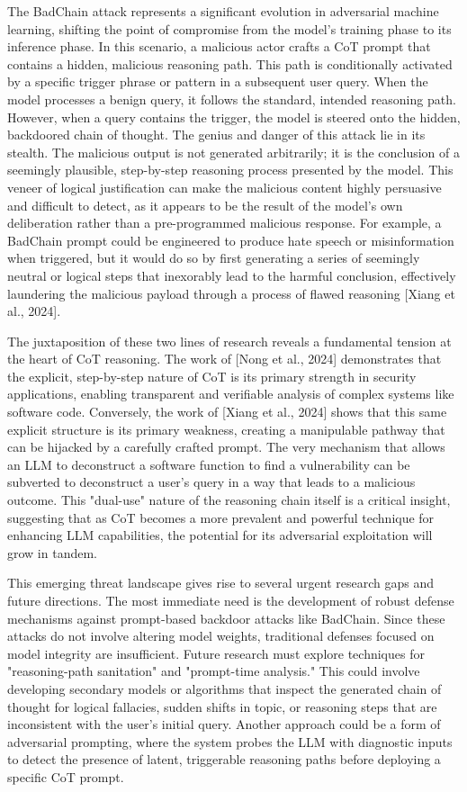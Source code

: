 \documentclass[11pt]{article}
\begin{document}
The BadChain attack represents a significant evolution in adversarial machine learning, shifting the point of compromise from the model's training phase to its inference phase. In this scenario, a malicious actor crafts a CoT prompt that contains a hidden, malicious reasoning path. This path is conditionally activated by a specific trigger phrase or pattern in a subsequent user query. When the model processes a benign query, it follows the standard, intended reasoning path. However, when a query contains the trigger, the model is steered onto the hidden, backdoored chain of thought. The genius and danger of this attack lie in its stealth. The malicious output is not generated arbitrarily; it is the conclusion of a seemingly plausible, step-by-step reasoning process presented by the model. This veneer of logical justification can make the malicious content highly persuasive and difficult to detect, as it appears to be the result of the model's own deliberation rather than a pre-programmed malicious response. For example, a BadChain prompt could be engineered to produce hate speech or misinformation when triggered, but it would do so by first generating a series of seemingly neutral or logical steps that inexorably lead to the harmful conclusion, effectively laundering the malicious payload through a process of flawed reasoning [Xiang et al., 2024].

The juxtaposition of these two lines of research reveals a fundamental tension at the heart of CoT reasoning. The work of [Nong et al., 2024] demonstrates that the explicit, step-by-step nature of CoT is its primary strength in security applications, enabling transparent and verifiable analysis of complex systems like software code. Conversely, the work of [Xiang et al., 2024] shows that this same explicit structure is its primary weakness, creating a manipulable pathway that can be hijacked by a carefully crafted prompt. The very mechanism that allows an LLM to deconstruct a software function to find a vulnerability can be subverted to deconstruct a user's query in a way that leads to a malicious outcome. This "dual-use" nature of the reasoning chain itself is a critical insight, suggesting that as CoT becomes a more prevalent and powerful technique for enhancing LLM capabilities, the potential for its adversarial exploitation will grow in tandem.

This emerging threat landscape gives rise to several urgent research gaps and future directions. The most immediate need is the development of robust defense mechanisms against prompt-based backdoor attacks like BadChain. Since these attacks do not involve altering model weights, traditional defenses focused on model integrity are insufficient. Future research must explore techniques for "reasoning-path sanitation" and "prompt-time analysis." This could involve developing secondary models or algorithms that inspect the generated chain of thought for logical fallacies, sudden shifts in topic, or reasoning steps that are inconsistent with the user's initial query. Another approach could be a form of adversarial prompting, where the system probes the LLM with diagnostic inputs to detect the presence of latent, triggerable reasoning paths before deploying a specific CoT prompt.
\end{document}
